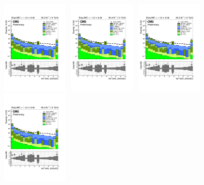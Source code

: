 \clearpage
\begin{figure}[h!]
  \begin{center}
    \includegraphics[width=0.3\textwidth,page=10,trim=0 100 50 100,clip]{figures/SITV/SIT/SIT.pdf}~
    \includegraphics[width=0.3\textwidth,page=6,trim=0 100 50 100,clip]{figures/SITV/SIT/SIT.pdf}~
    \includegraphics[width=0.3\textwidth,page=5,trim=0 100 50 100,clip]{figures/SITV/SIT/SIT.pdf}\\
    \includegraphics[width=0.3\textwidth,page=8,trim=0 100 50 100,clip]{figures/SITV/SIT/SIT.pdf}~

\end{center}
\end{figure}
